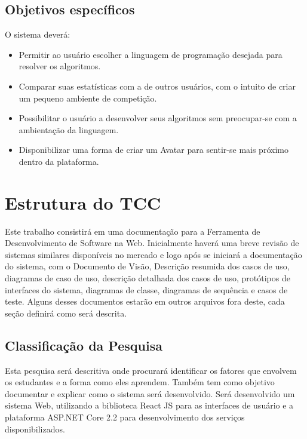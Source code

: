 \subsection{Objetivos específicos}
\label{subsec:objetivo-especificos}
O sistema deverá:
\begin{itemize}
	\item Permitir ao usuário escolher a linguagem de programação desejada para resolver os algoritmos.
	\item Comparar suas estatísticas com a de outros usuários, com o intuito de criar um pequeno ambiente de competição.
	\item Possibilitar o usuário a desenvolver seus algoritmos sem preocupar-se com a ambientação da linguagem.
	\item Disponibilizar uma forma de criar um Avatar para sentir-se mais próximo dentro da plataforma.
\end{itemize}


\section{Estrutura do TCC}
\label{sec:estruturacao}
Este trabalho consistirá em uma documentação para a Ferramenta de Desenvolvimento de Software na Web.
Inicialmente haverá uma breve revisão de sistemas similares disponíveis no mercado e logo após se iniciará a documentação do sistema, com o Documento de Visão, Descrição resumida dos casos de uso, diagramas de caso de uso, descrição detalhada dos casos de uso, protótipos de interfaces do sistema, diagramas de classe, diagramas de sequência e casos de teste.
Alguns desses documentos estarão em outros arquivos fora deste, cada seção definirá como será descrita.

\subsection{Classificação da Pesquisa}
\label{subsec:classificacao-pesquisa}
Esta pesquisa será descritiva onde procurará identificar os fatores que envolvem os estudantes e a forma como eles aprendem. Também tem como objetivo documentar e explicar como o sistema será desenvolvido.
Será desenvolvido um sistema Web, utilizando a biblioteca React JS para as interfaces de usuário e a plataforma ASP.NET Core 2.2 para desenvolvimento dos serviços disponibilizados.
